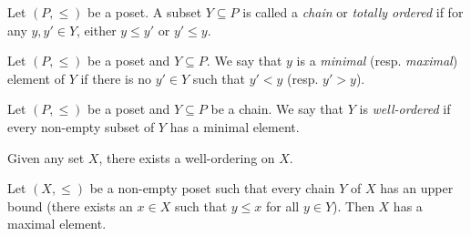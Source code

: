 \begin{definition}
    Let $(P, \le)$ be a poset.
    A subset $Y \subseteq P$ is called a \emph{chain} or \emph{totally
    ordered} if for any $y, y' \in Y$, either $y \le y'$ or $y' \le y$.
\end{definition}
\begin{definition}
    Let $(P, \le)$ be a poset and $Y \subseteq P$.
    We say that $y$ is a \emph{minimal} (resp. \emph{maximal}) element of
    $Y$ if there is no $y' \in Y$ such that $y' < y$ (resp. $y' > y$).
\end{definition}

\begin{definition}
    Let $(P, \le)$ be a poset and $Y \subseteq P$ be a chain.
    We say that $Y$ is \emph{well-ordered} if every non-empty subset of $Y$
    has a minimal element.
\end{definition}

\begin{axiom} \label{def:zfc:well-ordering}
    Given any set $X$, there exists a well-ordering on $X$.
\end{axiom}
\begin{axiom} \label{def:zfc:zorn}
    Let $(X, \le)$ be a non-empty poset such that every chain $Y$ of $X$ has
    an upper bound (there exists an $x \in X$ such that $y \le x$ for all
    $y \in Y$).
    Then $X$ has a maximal element.
\end{axiom}

